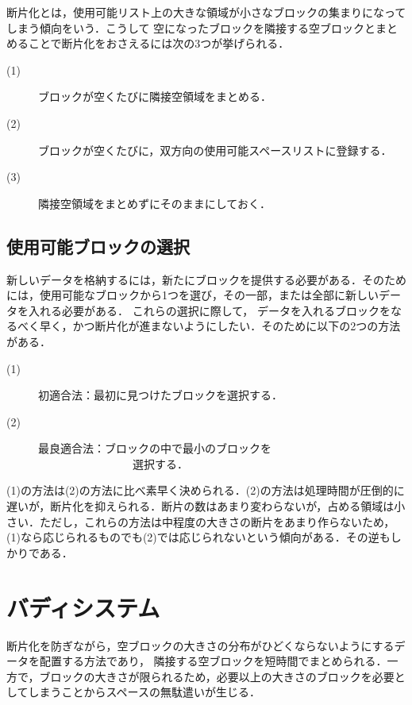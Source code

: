 \documentclass[twocolumn,10pt]{jarticle}
\begin{document}
断片化とは，使用可能リスト上の大きな領域が小さなブロックの集まりになってしまう傾向をいう．こうして
空になったブロックを隣接する空ブロックとまとめることで断片化をおさえるには次の3つが挙げられる．
%
\begin{description}
  \item[(1)] ブロックが空くたびに隣接空領域をまとめる．
  \item[(2)] ブロックが空くたびに，双方向の使用可能スペースリストに登録する．
  \item[(3)] 隣接空領域をまとめずにそのままにしておく．
\end{description}
%
%
\subsection{使用可能ブロックの選択}
%
新しいデータを格納するには，新たにブロックを提供する必要がある．そのためには，使用可能なブロックから1つを選び，その一部，または全部に新しいデータを入れる必要がある．
これらの選択に際して，
データを入れるブロックをなるべく早く，かつ断片化が進まないようにしたい．そのために以下の2つの方法がある．
%
\begin{description}
  \item[(1)] 初適合法：最初に見つけたブロックを選択する．
  \item[(2)] 最良適合法：ブロックの中で最小のブロックを\\~~~~~~~~~~~~~~~~~選択する．
\end{description}
%
%

(1)の方法は(2)の方法に比べ素早く決められる．(2)の方法は処理時間が圧倒的に遅いが，断片化を抑えられる．断片の数はあまり変わらないが，占める領域は小さい．ただし，これらの方法は中程度の大きさの断片をあまり作らないため，(1)なら応じられるものでも(2)では応じられないという傾向がある．その逆もしかりである．

\section{バディシステム}
%
断片化を防ぎながら，空ブロックの大きさの分布がひどくならないようにするデータを配置する方法であり，
隣接する空ブロックを短時間でまとめられる．一方で，ブロックの大きさが限られるため，必要以上の大きさのブロックを必要としてしまうことからスペースの無駄遣いが生じる．
\end{document}
